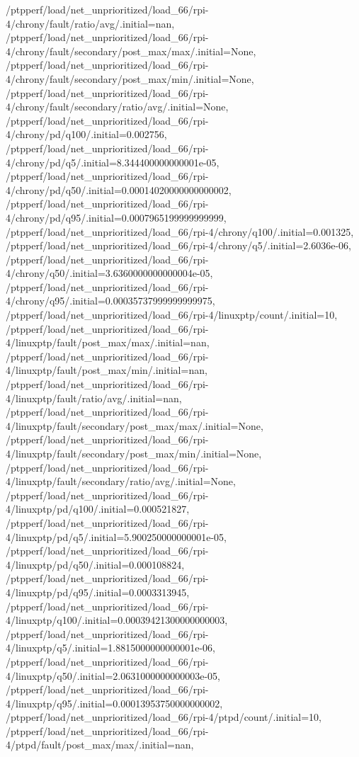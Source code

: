 {    /ptpperf/load/net_unprioritized/load_66/rpi-4/chrony/fault/ratio/avg/.initial=nan,
    /ptpperf/load/net_unprioritized/load_66/rpi-4/chrony/fault/secondary/post_max/max/.initial=None,
    /ptpperf/load/net_unprioritized/load_66/rpi-4/chrony/fault/secondary/post_max/min/.initial=None,
    /ptpperf/load/net_unprioritized/load_66/rpi-4/chrony/fault/secondary/ratio/avg/.initial=None,
    /ptpperf/load/net_unprioritized/load_66/rpi-4/chrony/pd/q100/.initial=0.002756,
    /ptpperf/load/net_unprioritized/load_66/rpi-4/chrony/pd/q5/.initial=8.344400000000001e-05,
    /ptpperf/load/net_unprioritized/load_66/rpi-4/chrony/pd/q50/.initial=0.00014020000000000002,
    /ptpperf/load/net_unprioritized/load_66/rpi-4/chrony/pd/q95/.initial=0.0007965199999999999,
    /ptpperf/load/net_unprioritized/load_66/rpi-4/chrony/q100/.initial=0.001325,
    /ptpperf/load/net_unprioritized/load_66/rpi-4/chrony/q5/.initial=2.6036e-06,
    /ptpperf/load/net_unprioritized/load_66/rpi-4/chrony/q50/.initial=3.6360000000000004e-05,
    /ptpperf/load/net_unprioritized/load_66/rpi-4/chrony/q95/.initial=0.00035737999999999975,
    /ptpperf/load/net_unprioritized/load_66/rpi-4/linuxptp/count/.initial=10,
    /ptpperf/load/net_unprioritized/load_66/rpi-4/linuxptp/fault/post_max/max/.initial=nan,
    /ptpperf/load/net_unprioritized/load_66/rpi-4/linuxptp/fault/post_max/min/.initial=nan,
    /ptpperf/load/net_unprioritized/load_66/rpi-4/linuxptp/fault/ratio/avg/.initial=nan,
    /ptpperf/load/net_unprioritized/load_66/rpi-4/linuxptp/fault/secondary/post_max/max/.initial=None,
    /ptpperf/load/net_unprioritized/load_66/rpi-4/linuxptp/fault/secondary/post_max/min/.initial=None,
    /ptpperf/load/net_unprioritized/load_66/rpi-4/linuxptp/fault/secondary/ratio/avg/.initial=None,
    /ptpperf/load/net_unprioritized/load_66/rpi-4/linuxptp/pd/q100/.initial=0.000521827,
    /ptpperf/load/net_unprioritized/load_66/rpi-4/linuxptp/pd/q5/.initial=5.900250000000001e-05,
    /ptpperf/load/net_unprioritized/load_66/rpi-4/linuxptp/pd/q50/.initial=0.000108824,
    /ptpperf/load/net_unprioritized/load_66/rpi-4/linuxptp/pd/q95/.initial=0.0003313945,
    /ptpperf/load/net_unprioritized/load_66/rpi-4/linuxptp/q100/.initial=0.00039421300000000003,
    /ptpperf/load/net_unprioritized/load_66/rpi-4/linuxptp/q5/.initial=1.8815000000000001e-06,
    /ptpperf/load/net_unprioritized/load_66/rpi-4/linuxptp/q50/.initial=2.0631000000000003e-05,
    /ptpperf/load/net_unprioritized/load_66/rpi-4/linuxptp/q95/.initial=0.00013953750000000002,
    /ptpperf/load/net_unprioritized/load_66/rpi-4/ptpd/count/.initial=10,
    /ptpperf/load/net_unprioritized/load_66/rpi-4/ptpd/fault/post_max/max/.initial=nan,
}
